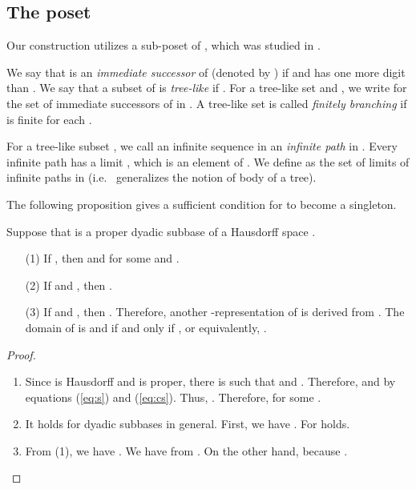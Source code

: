 \documentclass{eptcs-modified}
\begin{document}
\subsection{The poset }

Our construction utilizes
a sub-poset  of , which was studied in \cite{tsuiki4}.


We say that  is an \emph{immediate successor} of 
(denoted by )
if  and  has one more digit than .
We say that a subset  of   is \emph{tree-like} if
.
For a tree-like set  and ,
we write  for the set of immediate successors of  in .
A tree-like set  is called \emph{finitely branching} if
 is finite for each .

For a tree-like subset ,
we call an infinite sequence  in  an \emph{infinite path} in .
Every infinite path   has a limit ,
which is an element of .
We define  as the set of limits of infinite paths in  (i.e.~ generalizes the notion of body of a tree).





The following proposition gives a sufficient condition for  to become a singleton.
\begin{proposition}\label{prop:rho}
  Suppose that  is a proper dyadic subbase of a Hausdorff space .
\begin{itemize}
\item[(1)]  If , then  and  for some  and .

  \item[(2)] If  and , then .

\item[(3)] If  and , then .
Therefore,  another -representation   of  is derived from .
The domain of  is  and  if and only if ,
or equivalently, .
\end{itemize}
\begin{proof}
\begin{enumerate}
\item Since  is Hausdorff and  is proper, there is  such that
 and .  Therefore,   and
 by equations (\ref{eq:s}) and (\ref{eq:cs}).
Thus, .  Therefore,
 for some .

\item  It holds for dyadic subbases in general.
First, we have .  For  holds.


\item  From (1), we have .
We have  from .
On the other hand,  because .
\end{enumerate}
\end{proof}
\end{proposition}
\end{document}
